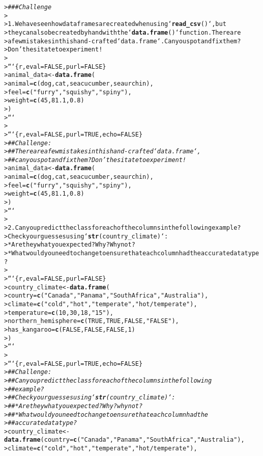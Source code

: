 \documentclass{article}\usepackage[]{graphicx}\usepackage[]{xcolor}
\makeatletter
\newcommand{\hlstr}[1]{\textcolor[rgb]{0.192,0.494,0.8}{#1}}%
\newcommand{\hlcom}[1]{\textcolor[rgb]{0.678,0.584,0.686}{\textit{#1}}}%
\newcommand{\hlkwd}[1]{\textcolor[rgb]{0.737,0.353,0.396}{\textbf{#1}}}%
\newenvironment{kframe}{%
 \def\at@end@of@kframe{}%
 \ifinner\ifhmode%
  \def\at@end@of@kframe{\end{minipage}}%
  \begin{minipage}{\columnwidth}%
 \fi\fi%
 \def\FrameCommand##1{\hskip\@totalleftmargin \hskip-\fboxsep
 \colorbox{shadecolor}{##1}\hskip-\fboxsep
     \hskip-\linewidth \hskip-\@totalleftmargin \hskip\columnwidth}%
 \MakeFramed {\advance\hsize-\width
   \@totalleftmargin\z@ \linewidth\hsize
   \@setminipage}}%
 {\par\unskip\endMakeFramed%
 \at@end@of@kframe}
\newenvironment{knitrout}{}{} %
\makeatother
\begin{document}
\begin{knitrout}
\begin{kframe}
\begin{alltt}
> \hlcom{### Challenge}
>
> 1. We have seen how data frames are created when using `\hlkwd{read_csv}()`, but
>   they can also be created by hand with the `\hlkwd{data.frame}()` function.  There are
>   a few mistakes in this hand-crafted `data.frame`. Can you spot and fix them?
>   Don't hesitate to experiment!
>
>     ```\{r, eval=FALSE, purl=FALSE\}
>     animal_data <- \hlkwd{data.frame}(
>               animal = \hlkwd{c}(dog, cat, sea cucumber, sea urchin),
>               feel = \hlkwd{c}(\hlstr{"furry"}, \hlstr{"squishy"}, \hlstr{"spiny"}),
>               weight = \hlkwd{c}(45, 8 1.1, 0.8)
>               )
>     ```
>
>     ```\{r, eval=FALSE, purl=TRUE, echo=FALSE\}
>     \hlcom{## Challenge:}
>     \hlcom{##  There are a few mistakes in this hand-crafted `data.frame`,}
>     \hlcom{##  can you spot and fix them? Don't hesitate to experiment!}
>     animal_data <- \hlkwd{data.frame}(
>           animal = \hlkwd{c}(dog, cat, sea cucumber, sea urchin),
>           feel = \hlkwd{c}(\hlstr{"furry"}, \hlstr{"squishy"}, \hlstr{"spiny"}),
>           weight = \hlkwd{c}(45, 8 1.1, 0.8)
>           )
>     ```
>
> 2. Can you predict the class for each of the columns in the following example?
>    Check your guesses using `\hlkwd{str}(country_climate)`:
>      * Are they what you expected?  Why? Why not?
>      * What would you need to change to ensure that each column had the accurate data type?
>
>     ```\{r, eval=FALSE, purl=FALSE\}
>     country_climate <- \hlkwd{data.frame}(
>            country = \hlkwd{c}(\hlstr{"Canada"}, \hlstr{"Panama"}, \hlstr{"South Africa"}, \hlstr{"Australia"}),
>            climate = \hlkwd{c}(\hlstr{"cold"}, \hlstr{"hot"}, \hlstr{"temperate"}, \hlstr{"hot/temperate"}),
>            temperature = \hlkwd{c}(10, 30, 18, \hlstr{"15"}),
>            northern_hemisphere = \hlkwd{c}(TRUE, TRUE, FALSE, \hlstr{"FALSE"}),
>            has_kangaroo = \hlkwd{c}(FALSE, FALSE, FALSE, 1)
>            )
>     ```
>
>    ```\{r, eval=FALSE, purl=TRUE, echo=FALSE\}
>    \hlcom{## Challenge:}
>    \hlcom{##   Can you predict the class for each of the columns in the following}
>    \hlcom{##   example?}
>    \hlcom{##   Check your guesses using `\hlkwd{str}(country_climate)`:}
>    \hlcom{##   * Are they what you expected? Why? why not?}
>    \hlcom{##   * What would you need to change to ensure that each column had the}
>    \hlcom{##     accurate data type?}
>    country_climate <- \hlkwd{data.frame}(country = \hlkwd{c}(\hlstr{"Canada"}, \hlstr{"Panama"}, \hlstr{"South Africa"}, \hlstr{"Australia"}),
>                                   climate = \hlkwd{c}(\hlstr{"cold"}, \hlstr{"hot"}, \hlstr{"temperate"}, \hlstr{"hot/temperate"}),

\end{alltt}
\end{kframe}
\end{knitrout}
\end{document}
